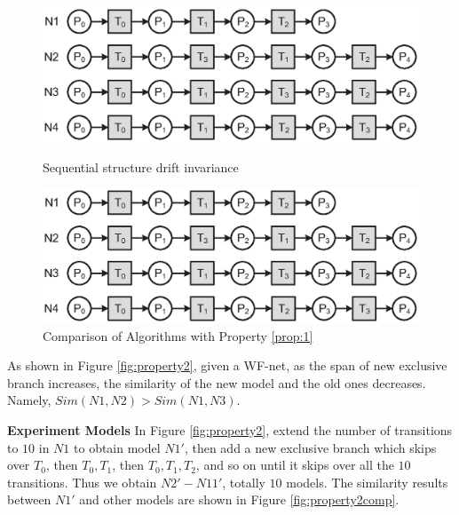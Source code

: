 \documentclass{llncs}
\begin{document}
\begin{figure}[ht]
\centering
\begin{minipage}[t]{0.45\textwidth}
	\centering
	\includegraphics[width=1\textwidth]{fig_property_1.eps}
	\caption{Sequential structure drift invariance}
	\label{fig:property1}
\end{minipage}
\hspace{0.1in}
\begin{minipage}[t]{0.45\textwidth}
	\centering
	\includegraphics[width=1\textwidth]{fig_property_1.eps}
	\caption{Comparison of Algorithms with Property \ref{prop:1}}
	\label{fig:property1comp}
\end{minipage}
\end{figure}

\begin{property}\label{prop:2}
As shown in Figure \ref{fig:property2}, given a WF-net, as the span of new exclusive branch increases, the similarity of the new model and the old ones decreases. Namely, $Sim(N1,N2)>Sim(N1,N3)$.
\end{property}
\textbf{Experiment Models} In Figure \ref{fig:property2}, extend the number of transitions to $10$ in $N1$ to obtain model $N1'$, then add a new exclusive branch which skips over $T_{0}$, then $T_{0},T_{1}$, then $T_{0},T_{1},T_{2}$, and so on until it skips over all the $10$ transitions. Thus we obtain $N2'-N11'$, totally $10$ models. The similarity results between $N1'$ and other models are shown in Figure \ref{fig:property2comp}.
\end{document}
